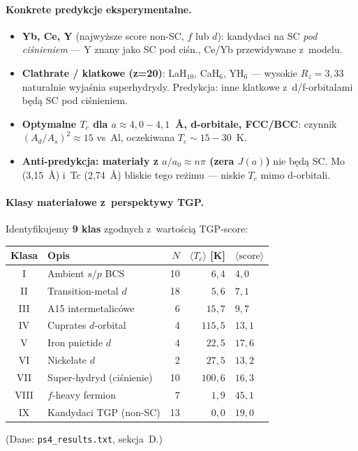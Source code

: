 \paragraph{Konkrete predykcje eksperymentalne.}
\begin{itemize}\itemsep0pt
  \item \textbf{Yb, Ce, Y} (najwy\.zsze score non-SC, $f$ lub $d$):
    kandydaci na SC \emph{pod ci\'snieniem} --- Y znany jako SC pod ci\'sn.,
    Ce/Yb przewidywane z~modelu.
  \item \textbf{Clathrate / klatkowe (z=20)}: LaH$_{10}$, CaH$_6$, YH$_6$ ---
    wysokie $R_z = 3{,}33$ naturalnie wyja\'snia superhydrydy. Predykcja:
    inne klatkowe z~d/f-orbitalami b\k{e}d\k{a} SC pod ci\'snieniem.
  \item \textbf{Optymalne $T_c$ dla $a\approx 4{,}0-4{,}1$~\AA, d-orbitale,
    FCC/BCC}: czynnik $(A_d/A_s)^2 \approx 15$ vs~Al, oczekiwana
    $T_c \sim 15-30$~K.
  \item \textbf{Anti-predykcja: materia\l{}y z $a/a_0 \approx n\pi$ (zera $J(a)$)}
    nie b\k{e}d\k{a} SC. Mo (3{,}15~\AA) i~Tc (2{,}74~\AA) bliskie tego
    re\.zimu --- niskie $T_c$ mimo d-orbitali.
\end{itemize}

\paragraph{Klasy materia\l{}owe z~perspektywy TGP.}
Identyfikujemy \textbf{9 klas} zgodnych z~warto\'sci\k{a} TGP-score:
\begin{center}\scriptsize
\begin{tabular}{@{}clrrl@{}}
\toprule
Klasa & Opis & $N$ & $\langle T_c\rangle$ [K] & $\langle\text{score}\rangle$ \\
\midrule
I    & Ambient $s/p$ BCS              & 10 & $6{,}4$     & $4{,}0$  \\
II   & Transition-metal $d$           & 18 & $5{,}6$     & $7{,}1$  \\
III  & A15 intermetalic\'owe         &  6 & $15{,}7$   & $9{,}7$  \\
IV   & Cuprates $d$-orbital          &  4 & $115{,}5$  & $13{,}1$ \\
V    & Iron pnictide $d$              &  4 & $22{,}5$   & $17{,}6$ \\
VI   & Nickelate $d$                   &  2 & $27{,}5$   & $13{,}2$ \\
VII  & Super-hydryd (ci\'snienie)    & 10 & $100{,}6$  & $16{,}3$ \\
VIII & $f$-heavy fermion              &  7 & $1{,}9$     & $45{,}1$ \\
IX   & Kandydaci TGP (non-SC)         & 13 & $0{,}0$     & $19{,}0$ \\
\bottomrule
\end{tabular}
\end{center}
(Dane: \texttt{ps4\_results.txt}, sekcja~D.)

